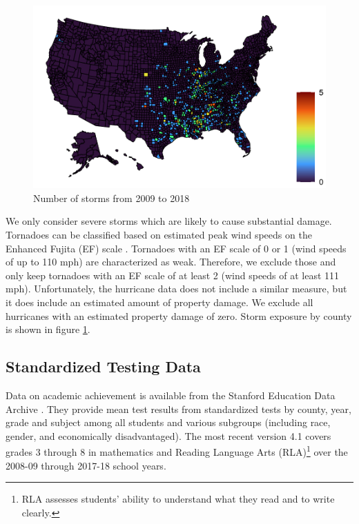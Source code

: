 \begin{figure}[!h]
	\centering
	\includegraphics[scale=1]{"../Code & Data/StormMap.pdf"}
	\caption{Number of storms from 2009 to 2018}
	\label{StormMap}
\end{figure}

We only consider severe storms which are likely to cause substantial damage. Tornadoes can be classified based on estimated peak wind speeds on the Enhanced Fujita (EF) scale \citep[for more details see][]{EF_Scale}. Tornadoes with an EF scale of 0 or 1 (wind speeds of up to 110 mph) are characterized as weak. Therefore, we exclude those and only keep tornadoes with an EF scale of at least 2 (wind speeds of at least 111 mph). Unfortunately, the hurricane data does not include a similar measure, but it does include an estimated amount of property damage. We exclude all hurricanes with an estimated property damage of zero.  Storm exposure by county is shown in figure \ref{StormMap}.


\subsection{Standardized Testing Data}

Data on academic achievement is available from the Stanford Education Data Archive \citep{SEDA}. They provide mean test results from standardized tests by county, year, grade and subject among all students and various subgroups (including race, gender, and economically disadvantaged). The most recent version 4.1 covers grades 3 through 8 in mathematics and Reading Language Arts (RLA)\footnote{RLA assesses students' ability to understand what they read and to write clearly.} over the 2008-09 through 2017-18 school years.

